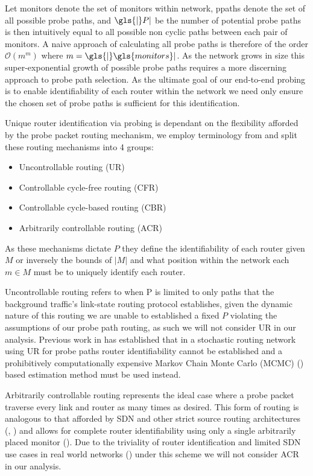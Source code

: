     Let \gls{monitors} denote the set of monitors within \gls{network}, \gls{ppaths} denote the set of all possible probe paths, and $\gls{|}P|$ be the number of potential probe paths  is then intuitively equal to all possible non cyclic paths between each pair of monitors. A naive approach of calculating all probe paths is therefore of the order $\mathcal{O}(m^m)$ where $m=\gls{|}\gls{monitors}|$. As the network grows in size this super-exponential growth of possible probe paths requires a more discerning approach to probe path selection. As the ultimate goal of our end-to-end probing is to enable identifiability of each router within the network we need only ensure the chosen set of probe paths is sufficient for this identification.\par
    
    Unique router identification via probing is dependant on the flexibility afforded by the probe packet routing mechanism, we employ terminology from \cite{he_network_2021} and split these routing mechanisms into 4 groups: \begin{itemize}
        \item Uncontrollable routing (UR)
        \item Controllable cycle-free routing (CFR)
        \item Controllable cycle-based routing (CBR)
        \item Arbitrarily controllable routing (ACR)
    \end{itemize}As these mechanisms dictate $P$ they define the identifiability of each router given $M$ or inversely the bounds of $|M|$ and what position within the network each $m\in M$ must be to uniquely identify each router.\par
    Uncontrollable routing refers to when P is limited to only paths that the background traffic's link-state routing protocol establishes, given the dynamic nature of this routing we are unable to established a fixed $P$ violating the assumptions of our probe path routing, as such we will not consider UR in our analysis. Previous work in \cite{barnes_stochastic_2020} has established that in a stochastic routing network using UR for probe paths router identifiability cannot be established and a prohibitively computationally expensive Markov Chain Monte Carlo (MCMC) (\cite{dellaportas_bayesian_2002}) based estimation method must be used instead.\par
    
    Arbitrarily controllable routing represents the ideal case where a probe packet traverse every link and router as many times as desired. This form of routing is analogous to that afforded by SDN and other strict source routing architectures (\cite{university_of_southern_california_darpa_1981}, \cite{open_networking_foundation_openflow_2015}) and allows for complete router identifiability using only a single arbitrarily placed monitor (\cite{he_network_2021}). Due to the triviality of router identification and limited SDN use cases in real world networks (\cite{jarschel_interfaces_2014}) under this scheme we will not consider ACR in our analysis.\par
    
